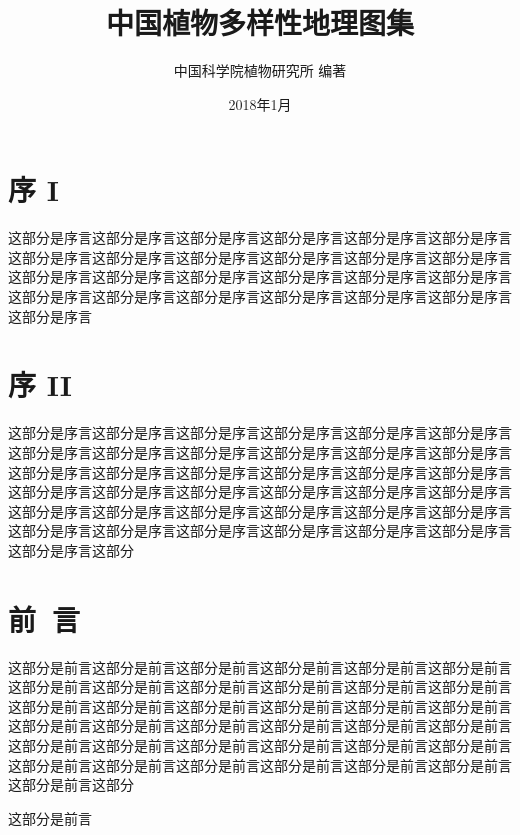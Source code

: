 \documentclass[utf8]{book}
\begin{document}

\title{中国植物多样性地理图集}

\author{中国科学院植物研究所 编著}

\date{2018年1月}


\frontmatter

\maketitle


\chapter{序 I}


这部分是序言这部分是序言这部分是序言这部分是序言这部分是序言这部分是序言这部分是序言这部分是序言这部分是序言这部分是序言这部分是序言这部分是序言这部分是序言这部分是序言这部分是序言这部分是序言这部分是序言这部分是序言这部分是序言这部分是序言这部分是序言这部分是序言这部分是序言这部分是序言这部分是序言


\chapter{序 II}


这部分是序言这部分是序言这部分是序言这部分是序言这部分是序言这部分是序言这部分是序言这部分是序言这部分是序言这部分是序言这部分是序言这部分是序言这部分是序言这部分是序言这部分是序言这部分是序言这部分是序言这部分是序言这部分是序言这部分是序言这部分是序言这部分是序言这部分是序言这部分是序言这部分是序言这部分是序言这部分是序言这部分是序言这部分是序言这部分是序言这部分是序言这部分是序言这部分是序言这部分是序言这部分是序言这部分是序言这部分是序言这部分


\chapter{前~言}


这部分是前言这部分是前言这部分是前言这部分是前言这部分是前言这部分是前言这部分是前言这部分是前言这部分是前言这部分是前言这部分是前言这部分是前言这部分是前言这部分是前言这部分是前言这部分是前言这部分是前言这部分是前言这部分是前言这部分是前言这部分是前言这部分是前言这部分是前言这部分是前言这部分是前言这部分是前言这部分是前言这部分是前言这部分是前言这部分是前言这部分是前言这部分是前言这部分是前言这部分是前言这部分是前言这部分是前言这部分是前言这部分


这部分是前言
\end{document}
